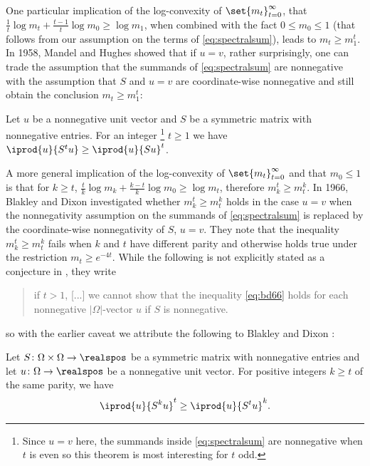 One particular implication of the log-convexity of 
$\set{m_t}_{t=0}^\infty$, that 
$\frac{1}{t}\log m_t + \frac{t-1}{t}\log m_0\ge \log m_1$,
when combined with the fact $0\le m_0\le 1$ (that follows from our
assumption on the terms of \autoref{eq:spectralsum}), leads to
$m_t\ge m_1^t$.
In 1958, Mandel and Hughes showed that if $u=v$, rather
surprisingly, one can trade the assumption that the summands of
\autoref{eq:spectralsum} are nonnegative with the assumption
that $S$ and $u=v$ are coordinate-wise nonnegative and still
obtain the conclusion $m_t\ge m_1^t$:
\begin{theorem}
\label{thm:blakley-roy}
Let $u$ be a nonnegative unit vector and 
$S$ be a symmetric matrix with nonnegative entries. For an integer%
\footnote{Since $u=v$ here, the summands inside 
\autoref{eq:spectralsum} are nonnegative when $t$ is even  
so this theorem is most interesting for $t$ odd.}
$t\ge1$ we have $\iprod{u}{S^tu}\ge \iprod{u}{Su}^t$.
\end{theorem}


A more general implication of the log-convexity of 
$\set{m_t}_{t=0}^\infty$ and that $m_0\le 1$ is that for 
$k\ge t$, $\frac{t}{k}\log m_k + \frac{k-t}{k}\log m_0\ge \log m_t$,
therefore $m_k^t\ge m_t^k$. In 1966,
Blakley and Dixon \cite{BlakleyD1966} investigated 
whether $m_k^t\ge m_t^k$ holds in the case $u=v$ when the nonnegativity
assumption on the summands of \autoref{eq:spectralsum} is
replaced by the coordinate-wise nonnegativity of $S$, $u=v$.
They note that the inequality $m_k^t\ge m_t^k$ 
fails when $k$ and $t$ have different 
parity and otherwise holds true under the restriction 
$m_t\ge e^{-4t}$.
While the following is not explicitly stated as a conjecture 
in \cite{BlakleyD1966}, they write
\begin{quote}
if $t> 1$, [...] we cannot show that the inequality
\autoref{eq:bd66} holds for each nonnegative $|\Omega|$-vector
$u$ if $S$ is nonnegative.
\end{quote}
so with the earlier caveat we attribute the following to Blakley and
Dixon \cite{BlakleyD1966}:

\begin{conjecture}
\label{conj:blakley-dixon}
Let $S\colon\Omega\times\Omega\to\realspos$ be a symmetric matrix
with nonnegative entries and let $u\colon\Omega\to\realspos$ be a
nonnegative unit vector. For positive integers 
$k\ge t$ of the same parity, we have
  \begin{align*}
    \iprod{u}{S^ku}^t\ge \iprod{u}{S^tu}^k.
  \end{align*}
\end{conjecture}

